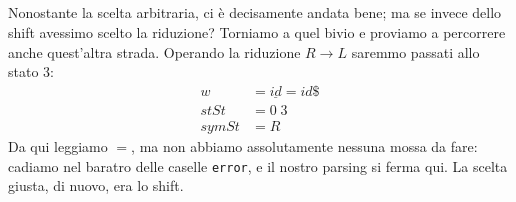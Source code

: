 \documentclass[class=book, crop=false, oneside, 12pt]{standalone}
\begin{document}
\subparagraph*{}
Nonostante la scelta arbitraria, ci è decisamente andata bene; ma se invece dello shift avessimo scelto la riduzione? Torniamo a quel bivio e proviamo a percorrere anche quest'altra strada. Operando la riduzione \(R \to L\) saremmo passati allo stato 3:
\begin{align*}
    w &= \underline{id}\!=id\$ \\
    stSt &= 0\;3 \\
    symSt &= R
\end{align*}
Da qui leggiamo \(=\), ma non abbiamo assolutamente nessuna mossa da fare: cadiamo nel baratro delle caselle \texttt{error}, e il nostro parsing si ferma qui. La scelta giusta, di nuovo, era lo shift.


\end{document}
